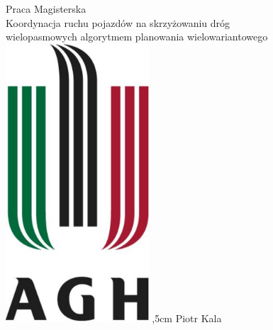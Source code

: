 \documentclass{report}
\begin{document}
\begin{titlepage}
    \centering
    \vfill
    {\Large
        Praca Magisterska \\                                     
        \vskip1cm
        Koordynacja ruchu pojazdów na skrzyżowaniu dróg \\
        wielopasmowych algorytmem planowania wielowariantowego}  
    \vskip2cm
    \includegraphics[width=0.4\textwidth]{logo_agh.eps}
    ,5cm
    \Large Piotr Kala\\
\end{titlepage}
\end{document}
